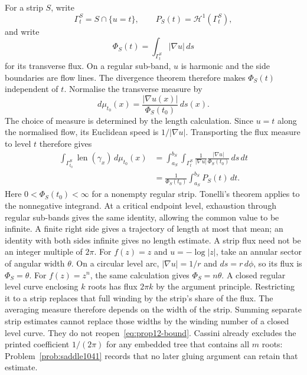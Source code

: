 \documentclass[11pt]{article}
\begin{document}
For a strip $S$, write
\[
 \Gamma_t^S=S\cap\{u=t\},\qquad
 P_S(t)=\mathcal H^1(\Gamma_t^S),
\]
and write
\[
 \Phi_S(t)=\int_{\Gamma_t^S}|\nabla u|\,ds
\]
for its transverse flux. On a regular sub-band, $u$ is harmonic and the
side boundaries are flow lines. The divergence theorem therefore makes
$\Phi_S(t)$ independent of $t$. Normalise the transverse measure by
\[
 d\mu_{t_0}(x)=\frac{|\nabla u(x)|}{\Phi_S(t_0)}\,ds(x).
\]
The choice of measure is determined by the length calculation. Since
$u=t$ along the normalised flow, its Euclidean speed is
$1/|\nabla u|$. Transporting the flux measure to level $t$ therefore gives
\[
 \begin{aligned}
 \int_{\Gamma_{t_0}^S}\operatorname{len}(\gamma_x)\,d\mu_{t_0}(x)
 &=\int_{a_S}^{b_S}\int_{\Gamma_t^S}
    \frac1{|\nabla u|}\frac{|\nabla u|}{\Phi_S(t_0)}\,ds\,dt\\
 &=\frac1{\Phi_S(t_0)}\int_{a_S}^{b_S}P_S(t)\,dt .
 \end{aligned}
\]
Here $0<\Phi_S(t_0)<\infty$ for a nonempty regular strip. Tonelli's
theorem applies to the nonnegative integrand. At a critical endpoint
level, exhaustion through regular sub-bands gives the same identity,
allowing the common value to be infinite. A finite right side gives a
trajectory of length at most that mean; an identity with both sides
infinite gives no length estimate.
A strip flux need not be an integer multiple of $2\pi$. For $f(z)=z$
and $u=-\log|z|$, take an annular sector of angular
width $\theta$. On a circular level arc, $|\nabla u|=1/r$ and
$ds=r\,d\phi$, so its flux is $\Phi_S=\theta$.
For $f(z)=z^n$, the same calculation gives $\Phi_S=n\theta$. A closed
regular level curve enclosing $k$ roots has flux $2\pi k$ by the argument
principle. Restricting it to a strip replaces that full winding by the
strip's share of the flux.
The averaging measure therefore depends on the width of the strip.
Summing separate strip estimates cannot replace those widths by the
winding number of a closed level curve.  They do not reopen~\eqref{eq:prop12-bound}.  Cassini already
excludes the printed coefficient $1/(2\pi)$ for any embedded tree that contains
all $m$ roots: Problem~\ref{prob:saddle1041} records that no later gluing
argument can retain that estimate.
\end{document}
